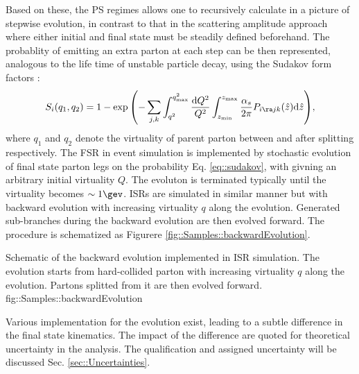 Based on these, the PS regimes allows one to recursively calculate in a picture of stepwise evolution, in contrast to that in the scattering amplitude approach where either initial and final state must be steadily defined beforehand. The probablity of emitting an extra parton at each step can be then represented, analogous to the life time of unstable particle decay, using the Sudakov form factors \cite{Sudakov}:
\begin{align}
S_{i}(q_1, q_2) = 1 - \exp{ \left( -\sum_{j,k} \int_{q^2}^{q_{\mathrm{max}}^2} \frac{\mathrm{d}Q^2}{Q^2} \int_{z_{\min}}^{z_{\max}} \frac{\alpha_s}{2\pi} P_{i \ra j k}(\hat{z}) \mathrm{d}\hat{z}  \right)},
\label{eq::sudakov}
\end{align}
where $q_1$ and $q_2$ denote the virtuality of parent parton between and after splitting respectively.
The FSR in event simulation is implemented by stochastic evolution of final state parton legs on the probability Eq. \ref{eq::sudakov}, with givning an arbitrary initial virtuality $Q$. The evoluton is terminated typically until the virtuality becomes $\sim 1\gev$. ISRs are simulated in similar manner but with backward evolution with increasing virtuality $q$ along the evolution.
Generated sub-branches during the backward evolution are then evolved forward. The procedure is schematized as Figurere \ref{fig::Samples::backwardEvolution}.

{Schematic of the backward evolution implemented in ISR simulation. The evolution starts from hard-collided parton with increasing virtuality $q$ along the evolution. Partons splitted from it are then evolved forward.}
{fig::Samples::backwardEvolution}

Various implementation for the evolution exist, leading to a subtle difference in the final state kinematics.
The impact of the difference are quoted for theoretical uncertainty in the analysis. The qualification and assigned uncertainty will be discussed Sec. \ref{sec::Uncertainties}. \\


